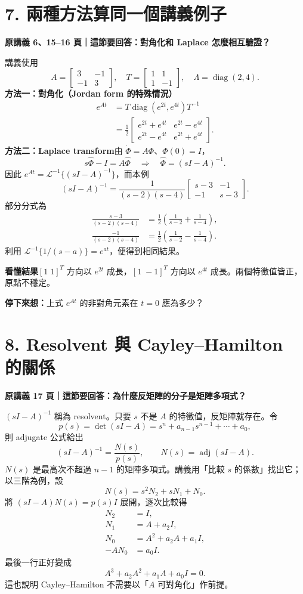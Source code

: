 \documentclass[12pt,a4paper]{article}
\newcommand{\topic}[3]{\clearpage\section*{#1}\textcolor{accent}{\textbf{原講義 #2 頁｜這節要回答：#3}}\par}
\newcommand{\checkq}[1]{\par\textbf{停下來想：}#1\par}
\DeclareMathOperator{\diag}{diag}
\begin{document}
\topic{7. 兩種方法算同一個講義例子}{6、15--16}{對角化和 Laplace 怎麼相互驗證？}
講義使用
\[
 A=\begin{bmatrix}3&-1\\-1&3\end{bmatrix},\quad
 T=\begin{bmatrix}1&1\\1&-1\end{bmatrix},\quad \Lambda=\diag(2,4).
\]
\textbf{方法一：對角化（Jordan form 的特殊情況）}
\begin{align*}
 e^{At}&=T\diag(e^{2t},e^{4t})T^{-1}\\
 &=\frac12\begin{bmatrix}
 e^{2t}+e^{4t}&e^{2t}-e^{4t}\\
 e^{2t}-e^{4t}&e^{2t}+e^{4t}
 \end{bmatrix}.
\end{align*}
\textbf{方法二：Laplace transform}\quad 由 $\dot\Phi=A\Phi$、$\Phi(0)=I$，
\[
 s\widehat\Phi-I=A\widehat\Phi
 \quad\Rightarrow\quad \widehat\Phi=(sI-A)^{-1}.
\]
因此 $e^{At}=\mathcal L^{-1}\{(sI-A)^{-1}\}$，而本例
\[
 (sI-A)^{-1}=\frac1{(s-2)(s-4)}
 \begin{bmatrix}s-3&-1\\-1&s-3\end{bmatrix}.
\]
部分分式為
\begin{align*}
 \frac{s-3}{(s-2)(s-4)}&=\frac12\left(\frac1{s-2}+\frac1{s-4}\right),\\
 \frac{-1}{(s-2)(s-4)}&=\frac12\left(\frac1{s-2}-\frac1{s-4}\right).
\end{align*}
利用 $\mathcal L^{-1}\{1/(s-a)\}=e^{at}$，便得到相同結果。

\textbf{看懂結果}\quad $[1\;1]^T$ 方向以 $e^{2t}$ 成長，$[1\;-1]^T$ 方向以 $e^{4t}$ 成長。兩個特徵值皆正，原點不穩定。
\checkq{上式 $e^{At}$ 的非對角元素在 $t=0$ 應為多少？}

\topic{8. Resolvent 與 Cayley--Hamilton 的關係}{17}{為什麼反矩陣的分子是矩陣多項式？}
$(sI-A)^{-1}$ 稱為 resolvent。只要 $s$ 不是 $A$ 的特徵值，反矩陣就存在。令
\[
 p(s)=\det(sI-A)=s^n+a_{n-1}s^{n-1}+\cdots+a_0,
\]
則 adjugate 公式給出
\[
 (sI-A)^{-1}=\frac{N(s)}{p(s)},\qquad N(s)=\operatorname{adj}(sI-A).
\]
$N(s)$ 是最高次不超過 $n-1$ 的矩陣多項式。講義用「比較 $s$ 的係數」找出它；以三階為例，設
\[
 N(s)=s^2N_2+sN_1+N_0.
\]
將 $(sI-A)N(s)=p(s)I$ 展開，逐次比較得
\begin{align*}
 N_2&=I,\\
 N_1&=A+a_2I,\\
 N_0&=A^2+a_2A+a_1I,\\
 -AN_0&=a_0I.
\end{align*}
最後一行正好變成
\[
 A^3+a_2A^2+a_1A+a_0I=0.
\]
這也說明 Cayley--Hamilton 不需要以「$A$ 可對角化」作前提。
\end{document}
